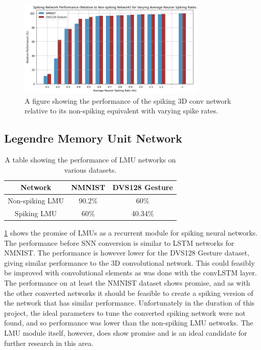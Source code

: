 \begin{figure}[htb]
    \centering
    \includegraphics[width=0.8\textwidth]{testingandresults/images/spiking_perfromace_with_varying_spike_rate.png}
    \caption{A figure showing the performance of the spiking 3D conv network relative to its non-spiking equivalent with varying spike rates.}
    \label{fig:spiking_perfromace_with_varying_spike_rate}
\end{figure}

\subsection{Legendre Memory Unit Network}

\begin{table}[htb]
    \centering
    \begin{tabular}{|| c | c | c ||}
        \hline
        Network     & NMNIST & DVS128 Gesture \\
        \hline \hline
        Non-spiking LMU        &  90.2\%    &    60\%  \\
        \hline
        Spiking LMU        &  60\%    &   40.34\%   \\
        \hline
    \end{tabular}
    \caption{A table showing the performance of LMU networks on various datasets.}
    \label{tab:lmu_performance}
\end{table}

\cref{tab:lmu_performance} shows the promise of LMUs as a recurrent module for spiking neural networks. The performance before SNN conversion is similar to LSTM networks for NMNIST. The performance is however lower for the DVS128 Gesture dataset, giving similar performance to the 3D convolutional network. This could feasibly be improved with convolutional elements as was done with the convLSTM layer. The performance on at least the NMNIST dataset shows promise, and as with the other converted networks it should be feasible to create a spiking version of the network that has similar performance. Unfortunately in the duration of this project, the ideal parameters to tune the converted spiking network were not found, and so performance was lower than the non-spiking LMU networks. The LMU module itself, however, does show promise and is an ideal candidate for further research in this area.